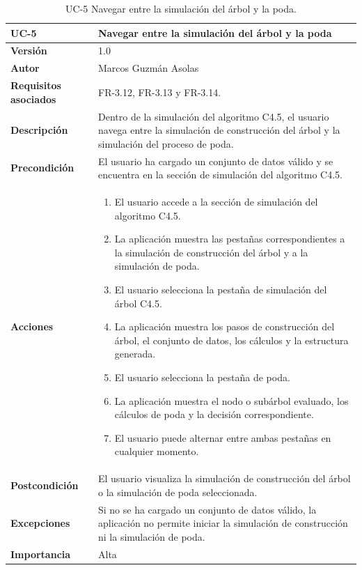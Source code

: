 \begin{table}[p]
    \centering
    \begin{tabularx}{\linewidth}{p{} p{}}
        \toprule
        \textbf{UC-5} & \textbf{Navegar entre la simulación del árbol y la poda} \\
        \toprule
        \textbf{Versión} & 1.0 \\
        \textbf{Autor} & Marcos Guzmán Asolas \\
        \textbf{Requisitos asociados} & FR-3.12, FR-3.13 y FR-3.14. \\
        \textbf{Descripción} & Dentro de la simulación del algoritmo C4.5, el usuario navega entre la simulación de construcción del árbol y la simulación del proceso de poda. \\
        \textbf{Precondición} & El usuario ha cargado un conjunto de datos válido y se encuentra en la sección de simulación del algoritmo C4.5. \\
        \textbf{Acciones} &
        \begin{enumerate}
            \def\labelenumi{\arabic{enumi}.}
            \tightlist
            \item El usuario accede a la sección de simulación del algoritmo C4.5.
            \item La aplicación muestra las pestañas correspondientes a la simulación de construcción del árbol y a la simulación de poda.
            \item El usuario selecciona la pestaña de simulación del árbol C4.5.
            \item La aplicación muestra los pasos de construcción del árbol, el conjunto de datos, los cálculos y la estructura generada.
            \item El usuario selecciona la pestaña de poda.
            \item La aplicación muestra el nodo o subárbol evaluado, los cálculos de poda y la decisión correspondiente.
            \item El usuario puede alternar entre ambas pestañas en cualquier momento.
        \end{enumerate} \\
        \textbf{Postcondición} & El usuario visualiza la simulación de construcción del árbol o la simulación de poda seleccionada. \\
        \textbf{Excepciones} & Si no se ha cargado un conjunto de datos válido, la aplicación no permite iniciar la simulación de construcción ni la simulación de poda. \\
        \textbf{Importancia} & Alta \\
        \bottomrule
    \end{tabularx}
    \caption{UC-5 Navegar entre la simulación del árbol y la poda.}
    \label{tabla:uc_5}
\end{table}


